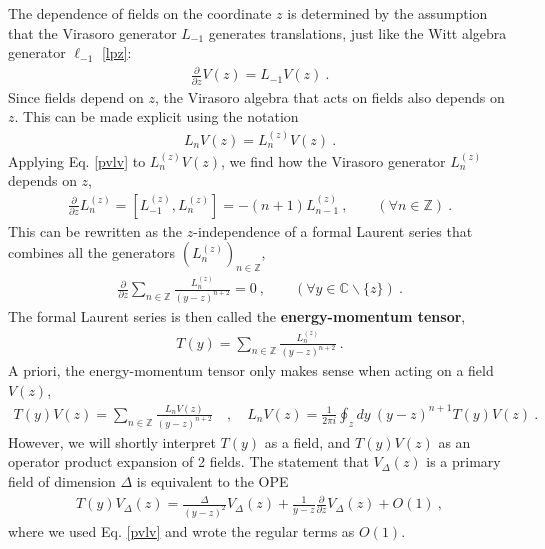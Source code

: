 \documentclass[12pt, a4paper]{article}
\newcommand{\myindex}[1]{\textbf{\boldmath #1}}
\theoremstyle{break}
\begin{document}
The dependence of fields on the coordinate $z$ is determined by the assumption that the Virasoro generator $L_{-1}$ generates translations, just like the Witt algebra generator $\ell_{-1}$ \eqref{lpz}:
\begin{align}
  \boxed{\frac{\partial}{\partial z} V(z) = L_{-1} V(z)}  \ .
  \label{pvlv}
 \end{align}
 Since fields depend on $z$, the Virasoro algebra that acts on fields also depends on $z$. This can be made explicit using the notation
\begin{align}
   L_n V(z) = L_n^{(z)} V(z) \ . 
\end{align}
Applying Eq. \eqref{pvlv} to $L_n^{(z)} V(z)$, we find how the Virasoro generator $L_n^{(z)}$ depends on $z$,
 \begin{align}
 \frac{\partial}{\partial z} L_n^{(z)} = [L_{-1}^{(z)},L_n^{(z)}]= -(n+1)L_{n-1}^{(z)}\ ,\qquad (\forall n\in\mathbb{Z})\ .
\end{align}
This can be rewritten as the $z$-independence of a formal Laurent series that combines all the generators $(L_n^{(z)})_{n\in\mathbb{Z}}$, 
\begin{align}
 \frac{\partial}{\partial z} \sum_{n\in\mathbb{Z}} \frac{L_n^{(z)}}{(y-z)^{n+2}} = 0\ ,\qquad (\forall y\in\mathbb{C}\backslash \{z\})\ .
\end{align}
The formal Laurent series is then called the \myindex{energy-momentum tensor}, 
\begin{align}
  \boxed{T(y) = \sum_{n\in\mathbb{Z}} \frac{L_n^{(z)}}{(y-z)^{n+2}}} \ .
  \label{tl}
 \end{align}
 A priori, the energy-momentum tensor only makes sense when acting on a field $V(z)$,
 \begin{align}
 T(y)V(z) = \sum_{n\in\mathbb{Z}} \frac{L_n V(z)}{(y-z)^{n+2}}\quad , \quad L_n V(z) = \frac{1}{2\pi i} \oint_{z}dy\ (y-z)^{n+1} T(y)V(z)\ .
 \label{lvtv}
\end{align}
However, we will shortly interpret $T(y)$ as a field, and $T(y)V(z)$ as an operator product expansion of 2 fields. The statement that $V_\Delta(z)$ is a primary field of dimension $\Delta$ is equivalent to the OPE 
\begin{align}
 \boxed{T(y)V_\Delta(z) = \frac{\Delta}{(y-z)^2} V_\Delta(z) + \frac{1}{y-z} \frac{\partial}{\partial z} V_\Delta(z) + O(1)}\ ,
 \label{tvd}
\end{align}
where we used Eq. \eqref{pvlv} and wrote the regular terms as $O(1)$.
\end{document}
